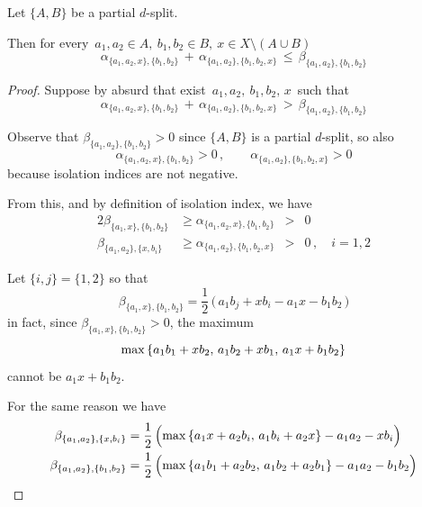 \documentclass[./main.tex]{subfiles}
\begin{document}
\begin{lemma} \label{lemma:teo1}
    Let $\{A,B\}$ be a partial $d$-split.
    
    Then for every $\, a_1,a_2 \in A,\ b_1,b_2 \in B,\ x \in X \setminus (A \cup B) \,$
    \[ \alpha_{\{a_1,a_2,x\},\{b_1,b_2\}} \,+\, \alpha_{\{a_1,a_2\},\{b_1,b_2,x\}} \,\leq\, \beta_{\{a_1,a_2\},\{b_1,b_2\}} \]
\end{lemma}
\begin{proof}
    Suppose by absurd that exist $\, a_1,a_2,\ b_1,b_2,\, x \,$ such that
    \[ \alpha_{\{a_1,a_2,x\},\{b_1,b_2\}} \,+\, \alpha_{\{a_1,a_2\},\{b_1,b_2,x\}} \,>\, \beta_{\{a_1,a_2\},\{b_1,b_2\}} \]

    Observe that $\beta_{\{a_1,a_2\},\{b_1,b_2\}} > 0$ since $\{A,B\}$ is a partial $d$-split, so also
    \[ \alpha_{\{a_1,a_2,x\},\{b_1,b_2\}} > 0 \,, \qquad \alpha_{\{a_1,a_2\},\{b_1,b_2,x\}} > 0 \]
    because isolation indices are not negative.

    From this, and by definition of isolation index, we have
    \begin{alignat*}{2}
        \beta_{\{a_1,x\},\{b_1,b_2\}} &\geq \alpha_{\{a_1,a_2,x\},\{b_1,b_2\}} &{}>{}& 0 \\
        \beta_{\{a_1,a_2\},\{x,b_i\}} &\geq \alpha_{\{a_1,a_2\},\{b_1,b_2,x\}} &{}>{}& 0 \,, \quad i = 1,2
    \end{alignat*} \smallskip
    
    Let $\{i,j\} = \{1,2\}$ so that 
    \[ \beta_{\{a_1,x\},\{b_1,b_2\}} = \frac{1}{2}\, \bigl(\, a_1 b_j + x b_i - a_1 x - b_1 b_2 \,\bigr) \]
    in fact, since $\beta_{\{a_1,x\},\{b_1,b_2\}} > 0$, the maximum
    \[ \max {\{ a_1 b_1 + x b_2,\, a_1 b_2 + x b_1,\, a_1 x + b_1 b_2 \}} \eqspace{2pt}{0pt} \]
    cannot be $a_1 x + b_1 b_2$.
    
    For the same reason we have
    \begin{align*}
        \beta_{\{a_1,a_2\},\{x,b_i\}} &= \frac{1}{2}\, \Bigl( \max {\{ a_1 x + a_2 b_i,\, a_1 b_i + a_2 x \}} - a_1 a_2 - x b_i \Bigr) \\
        \beta_{\{a_1,a_2\},\{b_1,b_2\}} &= \frac{1}{2}\, \Bigl( \max {\{ a_1 b_1 + a_2 b_2,\, a_1 b_2 + a_2 b_1 \}} - a_1 a_2 - b_1 b_2 \Bigr)
    \end{align*} \medskip
    

\end{proof}
\end{document}
